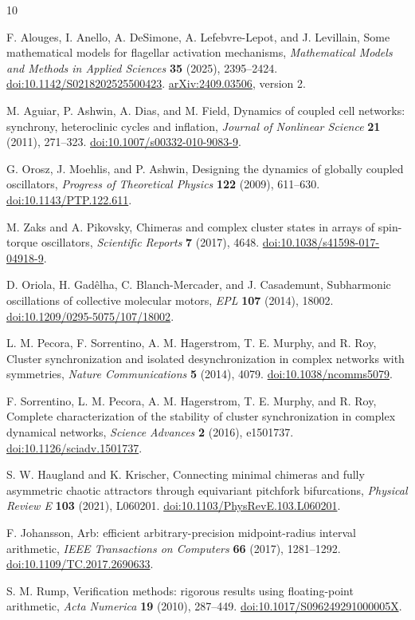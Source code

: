 \documentclass[11pt]{article}
\begin{document}
\begin{thebibliography}{10}
\raggedright
{}
F. Alouges, I. Anello, A. DeSimone, A. Lefebvre-Lepot, and J. Levillain,
Some mathematical models for flagellar activation mechanisms,
\emph{Mathematical Models and Methods in Applied Sciences} \textbf{35}
(2025), 2395--2424.
\href{https://doi.org/10.1142/S0218202525500423}{doi:10.1142/S0218202525500423}.
\href{https://arxiv.org/abs/2409.03506}{arXiv:2409.03506}, version 2.

M. Aguiar, P. Ashwin, A. Dias, and M. Field,
Dynamics of coupled cell networks: synchrony, heteroclinic cycles and inflation,
\emph{Journal of Nonlinear Science} \textbf{21} (2011), 271--323.
\href{https://doi.org/10.1007/s00332-010-9083-9}{doi:10.1007/s00332-010-9083-9}.

G. Orosz, J. Moehlis, and P. Ashwin,
Designing the dynamics of globally coupled oscillators,
\emph{Progress of Theoretical Physics} \textbf{122} (2009), 611--630.
\href{https://doi.org/10.1143/PTP.122.611}{doi:10.1143/PTP.122.611}.

M. Zaks and A. Pikovsky,
Chimeras and complex cluster states in arrays of spin-torque oscillators,
\emph{Scientific Reports} \textbf{7} (2017), 4648.
\href{https://doi.org/10.1038/s41598-017-04918-9}{doi:10.1038/s41598-017-04918-9}.

D. Oriola, H. Gad\^elha, C. Blanch-Mercader, and J. Casademunt,
Subharmonic oscillations of collective molecular motors,
\emph{EPL} \textbf{107} (2014), 18002.
\href{https://doi.org/10.1209/0295-5075/107/18002}{doi:10.1209/0295-5075/107/18002}.

L. M. Pecora, F. Sorrentino, A. M. Hagerstrom, T. E. Murphy, and R. Roy,
Cluster synchronization and isolated desynchronization in complex
networks with symmetries, \emph{Nature Communications} \textbf{5} (2014), 4079.
\href{https://doi.org/10.1038/ncomms5079}{doi:10.1038/ncomms5079}.

F. Sorrentino, L. M. Pecora, A. M. Hagerstrom, T. E. Murphy, and R. Roy,
Complete characterization of the stability of cluster synchronization in
complex dynamical networks, \emph{Science Advances} \textbf{2} (2016), e1501737.
\href{https://doi.org/10.1126/sciadv.1501737}{doi:10.1126/sciadv.1501737}.

S. W. Haugland and K. Krischer,
Connecting minimal chimeras and fully asymmetric chaotic attractors
through equivariant pitchfork bifurcations,
\emph{Physical Review E} \textbf{103} (2021), L060201.
\href{https://doi.org/10.1103/PhysRevE.103.L060201}{doi:10.1103/PhysRevE.103.L060201}.

F. Johansson, Arb: efficient arbitrary-precision midpoint-radius interval
arithmetic, \emph{IEEE Transactions on Computers} \textbf{66} (2017), 1281--1292.
\href{https://doi.org/10.1109/TC.2017.2690633}{doi:10.1109/TC.2017.2690633}.

S. M. Rump, Verification methods: rigorous results using floating-point
arithmetic, \emph{Acta Numerica} \textbf{19} (2010), 287--449.
\href{https://doi.org/10.1017/S096249291000005X}{doi:10.1017/S096249291000005X}.
\end{thebibliography}
\end{document}
